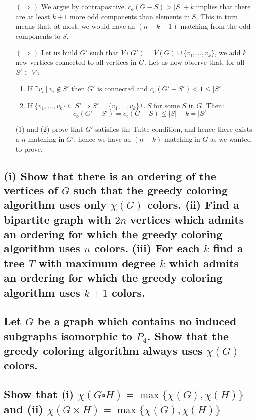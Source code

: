 \begin{itemize}
    \item[$(\Rightarrow)$] We argue by contrapositive.
        $c_o(G-S) > |S| + k$ implies that there are at least $k+1$ more odd components than elements in $S$.
        This in turn means that, at most, we would have an $(n - k -1)$-matching from the odd components to $S$.
    \item[$(\Rightarrow)$] Let us build $G'$ such that $V(G') = V(G) \cup \{v_1, \dots, v_k \}$, we add $k$ new vertices connected to all vertices in $G$.
        Let us now observe that, for all $S' \subset V'$:
        \begin{enumerate}
            \item If $\exists v_i \: | \: v_i \not\in S'$ then $G'$ is connected and $c_o(G' - S') < 1 \leq |S'|$.
            \item If $\{ v_1, \dots, v_k \} \subseteq S' \Rightarrow S' = \{v_1, \dots, v_k \} \cup S$ for some $S$ in $G$.
                Then:
                $$c_o(G' - S') = c_o(G - S) \leq |S| + k = |S'|$$
        \end{enumerate}
        (1) and (2) prove that $G'$ satisfies the Tutte condition, and hence there exists a $n$-matching in $G'$, hence we have an $(n-k)$-matching in $G$ as we wanted to prove.
\end{itemize}

\subsection[Matchings 7]{(i) Show that there is an ordering of the vertices of $G$ such that the greedy coloring algorithm uses only $\chi(G)$ colors. (ii) Find a bipartite graph with $2n$ vertices which admits an ordering for which the greedy coloring algorithm uses $n$ colors. (iii) For each $k$ find a tree $T$ with maximum degree $k$ which admits an ordering for which the greedy coloring algorithm uses $k+1$ colors.}

\subsection[Matchings 8]{Let $G$ be a graph which contains no induced subgraphs isomorphic to $P_4$. Show that the greedy coloring algorithm always uses $\chi(G)$ colors.}
\subsection[Matchings 9]{Show that (i) $\chi(G\square H) = \max\{\chi(G),\chi(H)\}$ and (ii) $\chi(G\times H) = \max\{\chi(G),\chi(H)\}$}

